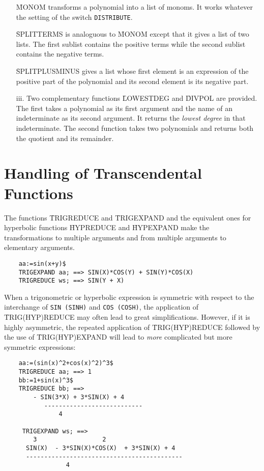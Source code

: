 \begin{itemize}
\f{MONOM} transforms a polynomial into a list of
monoms. It works whatever the setting of the switch {\tt DISTRIBUTE}.

\f{SPLITTERMS} is analoguous to \f{MONOM} except
that it gives a list of two lists.  The first sublist contains the
positive terms while the second sublist contains the negative terms.

\f{SPLITPLUSMINUS} gives a list whose first
element is an expression of the positive part of the polynomial and
its second element is its negative part.
\item[iii.]
Two complementary functions \f{LOWESTDEG} and
\f{DIVPOL} are provided.
The first takes a polynomial as its first argument and the name of an
indeterminate as its second argument.  It returns the {\em lowest degree}
in that indeterminate.  The second function takes two polynomials and
returns both the quotient and its remainder.
\end{itemize}

\section{Handling of Transcendental Functions}

The functions \f{TRIGREDUCE} and
\f{TRIGEXPAND} and the equivalent
ones for hyperbolic functions \f{HYPREDUCE} and
\f{HYPEXPAND}
make the transformations to multiple arguments and from
multiple arguments to elementary arguments.
\begin{verbatim}
	aa:=sin(x+y)$
	TRIGEXPAND aa; ==> SIN(X)*COS(Y) + SIN(Y)*COS(X)
	TRIGREDUCE ws; ==> SIN(Y + X)
\end{verbatim}
When a trigonometric or hyperbolic expression is symmetric with
respect to the interchange of {\tt SIN (SINH)} and {\tt COS (COSH)},
the application of \f{TRIG(HYP)REDUCE} may often lead to great
simplifications.  However, if it is highly asymmetric, the repeated
application of \f{TRIG(HYP)REDUCE} followed by the use of
\f{TRIG(HYP)EXPAND} will lead to {\em more} complicated
but more symmetric expressions:
\begin{verbatim}
	aa:=(sin(x)^2+cos(x)^2)^3$
	TRIGREDUCE aa; ==> 1
	bb:=1+sin(x)^3$
	TRIGREDUCE bb; ==>
		- SIN(3*X) + 3*SIN(X) + 4
	       ---------------------------
			   4

	 TRIGEXPAND ws; ==>
		3                  2
	  SIN(X)  - 3*SIN(X)*COS(X)  + 3*SIN(X) + 4
	  -------------------------------------------
			     4
\end{verbatim}

